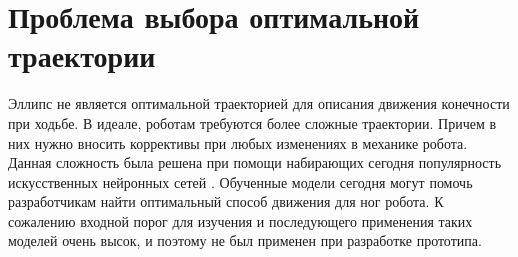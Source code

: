 \section{Проблема выбора оптимальной траектории}

Эллипс не является оптимальной траекторией для описания движения конечности при ходьбе. В идеале, роботам требуются более сложные траектории. Причем в них нужно вносить коррективы при любых изменениях в механике робота. Данная сложность была решена при помощи набирающих сегодня популярность искусственных нейронных сетей \cite{Singla2018}. Обученные модели сегодня могут помочь разработчикам найти оптимальный способ движения для ног робота. К сожалению входной порог для изучения и последующего применения таких моделей очень высок, и поэтому не был применен при разработке прототипа.